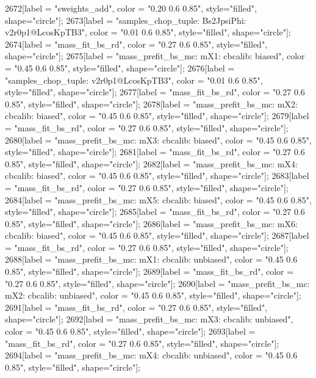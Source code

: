 {	2672[label = "sweights_add", color = "0.20 0.6 0.85", style="filled", shape="circle"];
	2673[label = "samples_chop_tuple\nmode: Bs2JpsiPhi\nversion: v2r0p1@LcosKpTB3", color = "0.01 0.6 0.85", style="filled", shape="circle"];
	2674[label = "mass_fit_bs_rd", color = "0.27 0.6 0.85", style="filled", shape="circle"];
	2675[label = "mass_prefit_bs_mc\nmassbin: mX1\nmassmodel: cbcalib\ntrigger: biased", color = "0.45 0.6 0.85", style="filled", shape="circle"];
	2676[label = "samples_chop_tuple\nversion: v2r0p1@LcosKpTB3", color = "0.01 0.6 0.85", style="filled", shape="circle"];
	2677[label = "mass_fit_bs_rd", color = "0.27 0.6 0.85", style="filled", shape="circle"];
	2678[label = "mass_prefit_bs_mc\nmassbin: mX2\nmassmodel: cbcalib\ntrigger: biased", color = "0.45 0.6 0.85", style="filled", shape="circle"];
	2679[label = "mass_fit_bs_rd", color = "0.27 0.6 0.85", style="filled", shape="circle"];
	2680[label = "mass_prefit_bs_mc\nmassbin: mX3\nmassmodel: cbcalib\ntrigger: biased", color = "0.45 0.6 0.85", style="filled", shape="circle"];
	2681[label = "mass_fit_bs_rd", color = "0.27 0.6 0.85", style="filled", shape="circle"];
	2682[label = "mass_prefit_bs_mc\nmassbin: mX4\nmassmodel: cbcalib\ntrigger: biased", color = "0.45 0.6 0.85", style="filled", shape="circle"];
	2683[label = "mass_fit_bs_rd", color = "0.27 0.6 0.85", style="filled", shape="circle"];
	2684[label = "mass_prefit_bs_mc\nmassbin: mX5\nmassmodel: cbcalib\ntrigger: biased", color = "0.45 0.6 0.85", style="filled", shape="circle"];
	2685[label = "mass_fit_bs_rd", color = "0.27 0.6 0.85", style="filled", shape="circle"];
	2686[label = "mass_prefit_bs_mc\nmassbin: mX6\nmassmodel: cbcalib\ntrigger: biased", color = "0.45 0.6 0.85", style="filled", shape="circle"];
	2687[label = "mass_fit_bs_rd", color = "0.27 0.6 0.85", style="filled", shape="circle"];
	2688[label = "mass_prefit_bs_mc\nmassbin: mX1\nmassmodel: cbcalib\ntrigger: unbiased", color = "0.45 0.6 0.85", style="filled", shape="circle"];
	2689[label = "mass_fit_bs_rd", color = "0.27 0.6 0.85", style="filled", shape="circle"];
	2690[label = "mass_prefit_bs_mc\nmassbin: mX2\nmassmodel: cbcalib\ntrigger: unbiased", color = "0.45 0.6 0.85", style="filled", shape="circle"];
	2691[label = "mass_fit_bs_rd", color = "0.27 0.6 0.85", style="filled", shape="circle"];
	2692[label = "mass_prefit_bs_mc\nmassbin: mX3\nmassmodel: cbcalib\ntrigger: unbiased", color = "0.45 0.6 0.85", style="filled", shape="circle"];
	2693[label = "mass_fit_bs_rd", color = "0.27 0.6 0.85", style="filled", shape="circle"];
	2694[label = "mass_prefit_bs_mc\nmassbin: mX4\nmassmodel: cbcalib\ntrigger: unbiased", color = "0.45 0.6 0.85", style="filled", shape="circle"];
}
